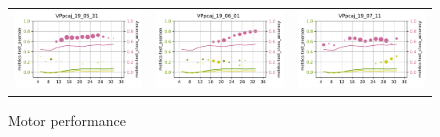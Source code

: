 \begin{figure}
\begin{tabular}{cc|c}
\includegraphics[width=\subplotwidth]{./figures/csp_spoc_incommon/bubble_csp_spoc_incommon_VPpcaj_d2_nolegend}& \includegraphics[width=\subplotwidth]{./figures/csp_spoc_incommon/bubble_csp_spoc_incommon_VPpcaj_d3_nolegend}& \includegraphics[width=\subplotwidth]{./figures/csp_spoc_incommon/bubble_csp_spoc_incommon_VPpcaj_d4_nolegend}\\
\end{tabular}
\caption{Motor performance}
\end{figure}